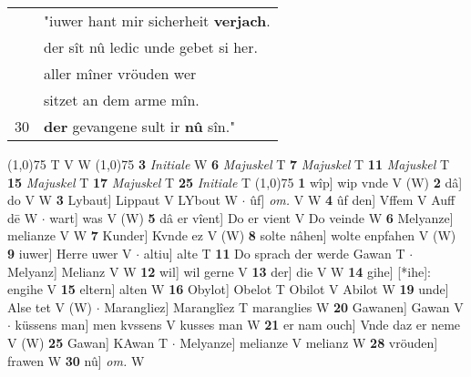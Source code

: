 \documentclass[8pt,a4paper,notitlepage]{article}
\begin{document}
\begin{table}[ht]
\begin{minipage}[t]{0.5\linewidth}
\begin{tabular}{rl}
 & "iuwer hant mir sicherheit \textbf{verjach}.\\ 
 & der sît nû ledic unde gebet si her.\\ 
 & aller mîner vröuden wer\\ 
 & sitzet an dem arme mîn.\\ 
30 & \textbf{der} gevangene sult ir \textbf{nû} sîn."\\ 
\end{tabular}
\scriptsize
\line(1,0){75} \newline
T V W \newline
\line(1,0){75} \newline
\textbf{3} \textit{Initiale} W  \textbf{6} \textit{Majuskel} T  \textbf{7} \textit{Majuskel} T  \textbf{11} \textit{Majuskel} T  \textbf{15} \textit{Majuskel} T  \textbf{17} \textit{Majuskel} T  \textbf{25} \textit{Initiale} T  \newline
\line(1,0){75} \newline
\textbf{1} wîp] wip vnde V (W) \textbf{2} dâ] do V W \textbf{3} Lybaut] Lippaut V LYbout W  $\cdot$ ûf] \textit{om.} V W \textbf{4} ûf den] Vffem V Auff dē W  $\cdot$ wart] was V (W) \textbf{5} dâ er vîent] Do er vient V Do veinde W \textbf{6} Melyanze] melianze V W \textbf{7} Kunder] Kvnde ez V (W) \textbf{8} solte nâhen] wolte enpfahen V (W) \textbf{9} iuwer] Herre uwer V  $\cdot$ altiu] alte T \textbf{11} Do sprach der werde Gawan T  $\cdot$ Melyanz] Melianz V W \textbf{12} wil] wil gerne V \textbf{13} der] die V W \textbf{14} gihe] [*ihe]: engihe V \textbf{15} eltern] alten W \textbf{16} Obylot] Obelot T Obilot V Abilot W \textbf{19} unde] Alse tet V (W)  $\cdot$ Marangliez] Maranglîez T maranglies W \textbf{20} Gawanen] Gawan V  $\cdot$ küssens man] men kvssens V kusses man W \textbf{21} er nam ouch] Vnde daz er neme V (W) \textbf{25} Gawan] KAwan T  $\cdot$ Melyanze] melianze V melianz W \textbf{28} vröuden] frawen W \textbf{30} nû] \textit{om.} W \newline
\end{minipage}
\end{table}
\end{document}
